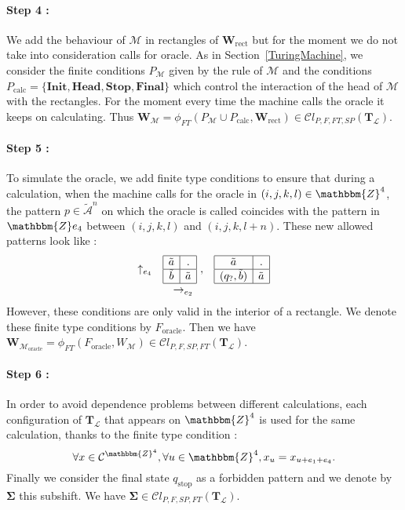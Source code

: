 \documentclass[proceedings]{stacs}
\theoremstyle{plain}\newtheorem{satz}[thm]{Satz}
\theoremstyle{definition}\newtheorem{crucial}[thm]{Crucial Definition}
\newcommand{\Z}{\mathbbm{Z}}
\newcommand{\A}{\mathcal{A}}
\newcommand{\T}{\mathbf{T}}
\newcommand{\Tfinal}{\mathbf{\Sigma}}
\newcommand{\W}{\mathbf{W}}
\newcommand{\TM}{\mathcal{M}}
\newcommand{\Lang}{\mathcal{L}}
\begin{document}
\paragraph{Step 4 :} We add the behaviour of $\TM$ in rectangles of $\W_{\textrm{rect}}$ but for the moment we do not take into consideration calls for oracle. As in Section~\ref{TuringMachine}, we consider the finite conditions $P_{\TM}$ given by the rule of $\TM$ and the conditions $P_{\textrm{calc}}=\{\textbf{Init}, \textbf{Head},\textbf{Stop},\textbf{Final}\}$ which control the interaction of the head of $\TM$ with the rectangles. For the moment every time the machine calls the oracle it keeps on calculating. Thus $\W_{\TM}=\phi_{FT}(P_{\TM}\cup P_{\textrm{calc}},\W_{\textrm{rect}}) \in \mathcal{C}l_{P,F,FT,SP}(\T_\Lang)$.

\paragraph{Step 5 :} To simulate the oracle, we add finite type conditions to ensure that during a calculation, when the machine calls for the oracle in $(i,j,k,l)\in\Z^4$, the pattern $p\in\tilde{\A}^n$ on which the oracle is called coincides with the pattern in $\Z e_4$ between $(i,j,k,l)$ and $(i,j,k,l+n)$. These new allowed patterns look like :
$$
\begin{array}{ccccc}
 \uparrow_{e_4} & 
\begin{array}{|c|c|}
\hline 
\tilde{a} & .\\
\hline
\tilde{b} & \tilde{a}\\
\hline
\end{array}~, 
 &
\begin{array}{|c|c|}
\hline
\tilde{a} & .\\
\hline
(q_?,\tilde{b}) & \tilde{a}\\ 
\hline
\end{array}
\\
 & \rightarrow_{e_2} & 
\end{array}
$$
However, these conditions are only valid in the interior of a rectangle. We denote these finite type conditions by $F_{\textrm{oracle}}$. Then we have $\W_{\TM_{\textrm{oracle}}}=\phi_{FT}(F_{\textrm{oracle}},W_{\TM}) \in \mathcal{C}l_{P,F,SP,FT}(\T_\Lang)$.

\paragraph{Step 6 :} In order to avoid dependence problems between different calculations, each configuration of $\T_\Lang$ that appears on $\mathbbm{Z}^4$ is used for the same calculation, thanks to the finite type condition :
$$\forall x\in \mathcal{C}^{\mathbbm{Z}^4}, \forall u\in\mathbbm{Z}^4, x_u=x_{u+e_1+e_4}.$$
Finally we consider the final state $q_{\textrm{stop}}$ as a forbidden pattern and we denote by $\Tfinal$ this subshift. We have $\Tfinal\in \mathcal{C}l_{P,F,SP,FT}(\T_\Lang)$.
\end{document}
